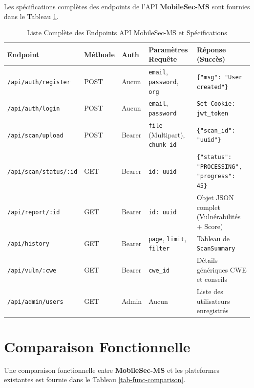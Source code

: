 \documentclass[
  journal=largetwo,
  manuscript=article-type,
  year=2025,
  volume=1,
]{cup-journal}
\begin{document}
Les spécifications complètes des endpoints de l'API \textbf{MobileSec-MS} sont fournies dans le Tableau \ref{tab-api-specs}.

\begin{table}[hbt!]
\centering
\caption{Liste Complète des Endpoints API MobileSec-MS et Spécifications}
\label{tab-api-specs}
\begin{tabular}{p{4cm}p{1.5cm}p{2cm}p{4cm}p{5cm}}
\toprule
\textbf{Endpoint} & \textbf{Méthode} & \textbf{Auth} & \textbf{Paramètres Requête} & \textbf{Réponse (Succès)} \\
\midrule
\texttt{/api/auth/register} & POST & Aucun & \texttt{email}, \texttt{password}, \texttt{org} & \texttt{\{"msg": "User created"\}} \\
\texttt{/api/auth/login} & POST & Aucun & \texttt{email}, \texttt{password} & \texttt{Set-Cookie: jwt\_token} \\
\texttt{/api/scan/upload} & POST & Bearer & \texttt{file} (Multipart), \texttt{chunk\_id} & \texttt{\{"scan\_id": "uuid"\}} \\
\texttt{/api/scan/status/:id} & GET & Bearer & \texttt{id: uuid} & \texttt{\{"status": "PROCESSING", "progress": 45\}} \\
\texttt{/api/report/:id} & GET & Bearer & \texttt{id: uuid} & Objet JSON complet (Vulnérabilités + Score) \\
\texttt{/api/history} & GET & Bearer & \texttt{page}, \texttt{limit}, \texttt{filter} & Tableau de \texttt{ScanSummary} \\
\texttt{/api/vuln/:cwe} & GET & Bearer & \texttt{cwe\_id} & Détails génériques CWE et conseils \\
\texttt{/api/admin/users} & GET & Admin & Aucun & Liste des utilisateurs enregistrés \\
\bottomrule
\end{tabular}
\end{table}

\section{Comparaison Fonctionnelle}
\label{app-comparison}

Une comparaison fonctionnelle entre \textbf{MobileSec-MS} et les plateformes existantes est fournie dans le Tableau \ref{tab-func-comparison}.
\end{document}
